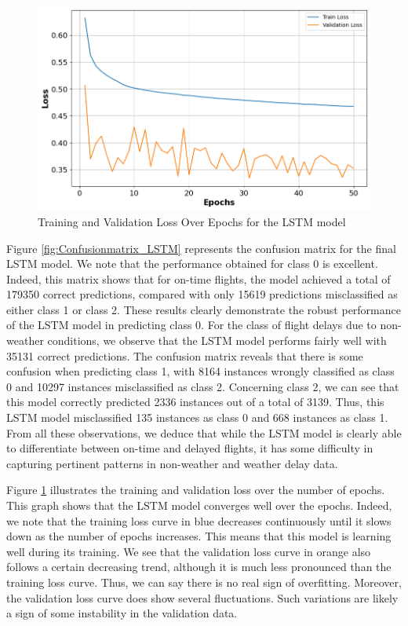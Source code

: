 \documentclass[12pt,oneside]{book} %
\begin{document}
\begin{figure}[H]
    \centering
    \includegraphics[width=0.89\linewidth]{Image/LSTM_loss.png}
    \caption{\centering Training and Validation Loss Over Epochs for the LSTM model}
    \label{fig:LSTM_LOSS}
\end{figure}

\noindent Figure \ref{fig:Confusionmatrix_LSTM} represents the confusion matrix for the final LSTM model. We note that the performance obtained for class 0 is excellent. Indeed, this matrix shows that for on-time flights, the model achieved a total of 179350 correct predictions, compared with only 15619 predictions misclassified as either class 1 or class 2. These results clearly demonstrate the robust performance of the LSTM model in predicting class 0. For the class of flight delays due to non-weather conditions, we observe that the LSTM model performs fairly well with 35131 correct predictions. The confusion matrix reveals that there is some confusion when predicting class 1, with 8164 instances wrongly classified as class 0 and 10297 instances misclassified as class 2. Concerning class 2, we can see that this model correctly predicted 2336 instances out of a total of 3139. Thus, this LSTM model misclassified 135 instances as class 0 and 668 instances as class 1. From all these observations, we deduce that while the LSTM model is clearly able to differentiate between on-time and delayed flights, it has some difficulty in capturing pertinent patterns in non-weather and weather delay data.

\noindent Figure \ref{fig:LSTM_LOSS} illustrates the training and validation loss over the number of epochs. This graph shows that the LSTM model converges well over the epochs. Indeed, we note that the training loss curve in blue decreases continuously until it slows down as the number of epochs increases. This means that this model is learning well during its training. We see that the validation loss curve in orange also follows a certain decreasing trend, although it is much less pronounced than the training loss curve. Thus, we can say there is no real sign of overfitting. Moreover, the validation loss curve does show several fluctuations. Such variations are likely a sign of some instability in the validation data.
\end{document}
